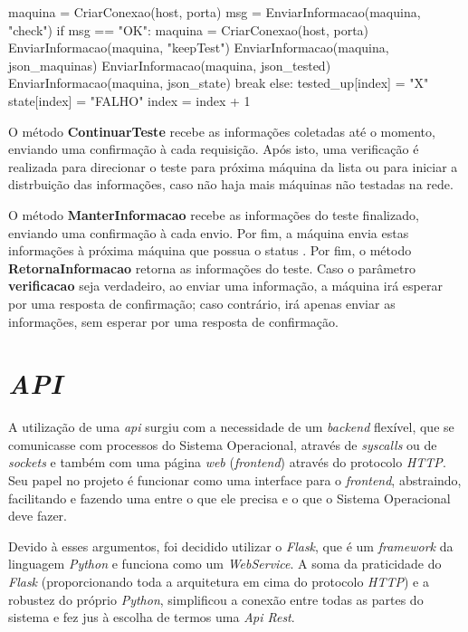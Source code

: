 \vspace*{1cm}
\begin{python}
    maquina = CriarConexao(host, porta)
    msg = EnviarInformacao(maquina, "check")
    if msg == "OK":
        maquina = CriarConexao(host, porta)
        EnviarInformacao(maquina, "keepTest")
        EnviarInformacao(maquina, json_maquinas)
        EnviarInformacao(maquina, json_tested)
        EnviarInformacao(maquina, json_state)
        break
    else:
        tested_up[index] = "X"
        state[index] = "FALHO"
        index = index + 1
\end{python}
\vspace*{1cm}

O método \textbf{ContinuarTeste} recebe as informações coletadas até o momento, enviando uma confirmação à cada requisição. Após isto, uma verificação é realizada para direcionar 
o teste para próxima máquina da lista ou para iniciar a distrbuição das informações, caso não haja mais máquinas não testadas na rede.

O método \textbf{ManterInformacao} recebe as informações do teste finalizado, enviando uma confirmação à cada envio. Por fim, a máquina envia estas informações à próxima máquina que possua o status 
. Por fim, o método \textbf{RetornaInformacao} retorna as informações do teste. Caso o parâmetro \textbf{verificacao} seja verdadeiro, ao enviar uma informação, a máquina irá esperar por uma resposta 
de confirmação; caso contrário, irá apenas enviar as informações, sem esperar por uma resposta de confirmação.




\section{\textit{API}}
\label{sec:api}

A utilização de uma \textit{api} surgiu com a necessidade de um \textit{backend} flexível, que se comunicasse com processos do Sistema Operacional, através de \textit{syscalls} ou de \textit{sockets} e também com uma página \textit{web} (\textit{frontend}) através do protocolo \textit{HTTP}. Seu papel no projeto é funcionar como uma interface para o \textit{frontend}, abstraindo, facilitando e fazendo uma  entre o que ele precisa e o que o Sistema Operacional deve fazer.

Devido à esses argumentos, foi decidido utilizar o \textit{Flask}, que é um \textit{framework} da linguagem \textit{Python} e funciona como um \textit{WebService}. 
A soma da praticidade do \textit{Flask} (proporcionando toda a arquitetura em cima do protocolo \textit{HTTP}) e a robustez do próprio \textit{Python}, simplificou a conexão entre todas as partes do sistema e fez jus à escolha de termos uma \textit{Api Rest}.

